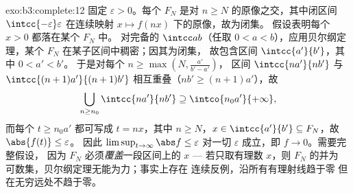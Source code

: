 \begin{solution}{exo:b3:complete:12}
固定 $\varepsilon > 0$。每个 $F_N$ 是对 $n
\geq N$ 的原像之交，其中闭区间 $\intcc{-\varepsilon}
\varepsilon$ 在连续映射 $x \mapsto f(nx)$ 下的原像，故为闭集。
假设表明每个 $x > 0$ 都落在某个 $F_N$ 中。
对完备的 $\intcc ab$（任取 $0 < a <
b$），应用贝尔纲定理，某个 $F_N$ 在某子区间中稠密；因其为闭集，
故包含区间 $\intcc{a'}{b'}$，其中 $0 < a' < b'$。
于是对每个 $n \geq \max(N, \frac{a'}{b' - a'})$，
区间 $\intcc{na'}{nb'}$ 与 $\intcc{(n+1)a'}{(n+1)b'}$
相互重叠（$nb' \geq (n+1)a'$），故
\[
\bigcup_{n \geq n_0}\intcc{na'}{nb'} \supseteq
\intco{n_0a'}{+\infty},
\]
而每个 $t \geq n_0a'$ 都可写成 $t = nx$，其中 $n \geq N$，$x \in
\intcc{a'}{b'} \subseteq F_N$，故 $\abs{f(t)} \leq \varepsilon$。
因此 $\limsup_{t\to\infty}\abs f \leq \varepsilon$ 对一切
$\varepsilon$ 成立，即 $f \to 0$。需要完整假设，
因为 $F_N$ 必须\emph{覆盖}一段区间上的 $x$
--- 若只取有理数 $x$，则 $F_N$ 的并为
可数集，贝尔纲定理无能为力；事实上存在
连续反例，沿所有有理射线趋于零
但在无穷远处不趋于零。
\end{solution}

